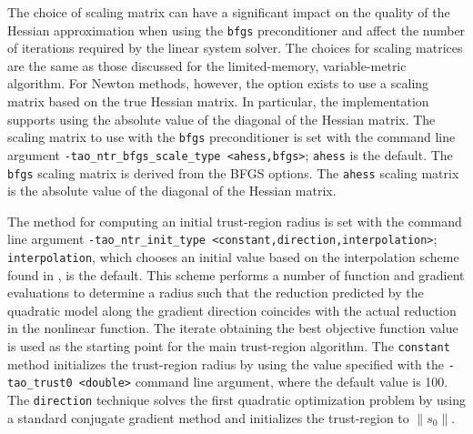The choice of scaling matrix can have a significant impact on the quality 
of the Hessian approximation when using the {\tt bfgs} preconditioner and
affect the number of iterations required by the linear system solver.
The choices for scaling matrices are the same as those discussed for 
the limited-memory, variable-metric algorithm.  For Newton methods,
however, the option exists to use a scaling matrix based on the true
Hessian matrix.  In particular, the implementation supports using the 
absolute value of the diagonal of the Hessian matrix.  The scaling 
matrix to use with the {\tt bfgs} preconditioner is set with the 
command line argument {\tt -tao\_ntr\_bfgs\_scale\_type <ahess,bfgs>}; 
{\tt ahess} is the default.  The {\tt bfgs} scaling matrix is derived from 
the BFGS options.  The {\tt ahess} scaling matrix is the absolute value of 
the diagonal of the Hessian matrix.

The method for computing an initial trust-region radius is set with the 
command line argument {\tt -tao\_ntr\_init\_type <constant,direction,interpolation>};
{\tt interpolation}, which chooses an initial value based on the 
interpolation scheme found in \cite{CGT}, is the default.  This
scheme performs a number of function and gradient evaluations to determine 
a radius such that the reduction predicted by the quadratic model along the 
gradient direction coincides with the actual reduction in the nonlinear 
function.  The iterate obtaining the best objective function value is 
used as the starting point for the main trust-region algorithm.  The 
{\tt constant} method initializes the trust-region radius by using 
the value specified with the {\tt -tao\_trust0 <double>} command line 
argument, where the default value is 100.  The {\tt direction} technique 
solves the first quadratic optimization problem by using a standard 
conjugate gradient method and initializes the trust-region to 
$\|s_0\|$.

